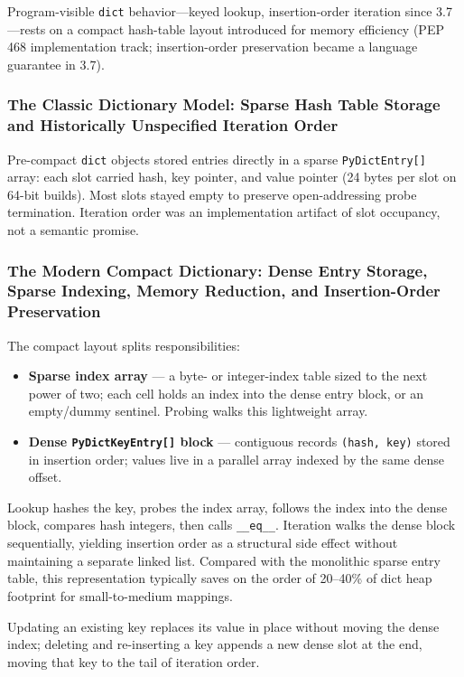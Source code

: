 \documentclass[a4paper,twoside]{report}
\begin{document}
Program-visible \texttt{dict} behavior---keyed lookup, insertion-order iteration since 3.7---rests on a compact hash-table layout introduced for memory efficiency (PEP 468 implementation track; insertion-order preservation became a language guarantee in 3.7).

\subsubsection{The Classic Dictionary Model: Sparse Hash Table Storage and Historically Unspecified Iteration Order}

Pre-compact \texttt{dict} objects stored entries directly in a sparse \texttt{PyDictEntry[]} array: each slot carried hash, key pointer, and value pointer (24 bytes per slot on 64-bit builds). Most slots stayed empty to preserve open-addressing probe termination. Iteration order was an implementation artifact of slot occupancy, not a semantic promise.

\subsubsection{The Modern Compact Dictionary: Dense Entry Storage, Sparse Indexing, Memory Reduction, and Insertion-Order Preservation}

The compact layout splits responsibilities:

\begin{itemize}
    \item \textbf{Sparse index array} --- a byte- or integer-index table sized to the next power of two; each cell holds an index into the dense entry block, or an empty/dummy sentinel. Probing walks this lightweight array.
    \item \textbf{Dense \texttt{PyDictKeyEntry[]} block} --- contiguous records \texttt{(hash, key)} stored in insertion order; values live in a parallel array indexed by the same dense offset.
\end{itemize}

Lookup hashes the key, probes the index array, follows the index into the dense block, compares hash integers, then calls \texttt{\_\_eq\_\_}. Iteration walks the dense block sequentially, yielding insertion order as a structural side effect without maintaining a separate linked list. Compared with the monolithic sparse entry table, this representation typically saves on the order of 20--40\% of dict heap footprint for small-to-medium mappings.

Updating an existing key replaces its value in place without moving the dense index; deleting and re-inserting a key appends a new dense slot at the end, moving that key to the tail of iteration order.
\end{document}
